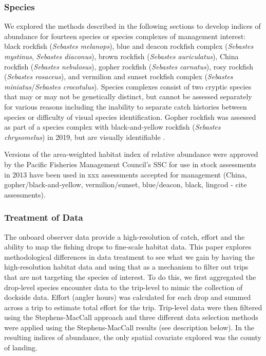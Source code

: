 \documentclass[preprint, 3p,
authoryear]{elsarticle} %
\begin{document}
\hypertarget{species}{%
\subsubsection{Species}\label{species}}

We explored the methods described in the following sections to develop
indices of abundance for fourteen species or species complexes of
management interest: black rockfish (\emph{Sebastes melanops}), blue and
deacon rockfish complex (\emph{Sebastes mystinus}, \emph{Sebastes
diaconus}), brown rockfish (\emph{Sebastes auriculatus}), China rockfish
(\emph{Sebastes nebulosus}), gopher rockfish (\emph{Sebastes carnatus}),
rosy rockfish (\emph{Sebastes rosaceus}), and vermilion and sunset
rockfish complex (\emph{Sebastes miniatus}/\emph{Sebastes crocotulus}).
Species complexes consist of two cryptic species that may or may not be
genetically distinct, but cannot be assessed separately for various
reasons including the inability to separate catch histories between
species or difficulty of visual species identification. Gopher rockfish
was assessed as part of a species complex with black-and-yellow rockfish
(\emph{Sebastes chrysomelus}) in 2019, but are visually identifiable
\citep{Monk2019}.

Versions of the area-weighted habitat index of relative abundance were
approved by the Pacific Fisheries Management Council's SSC for use in
stock assessments in 2013 have been used in xxx assessments accepted for
management (China, gopher/black-and-yellow, vermilion/sunset,
blue/deacon, black, lingcod - cite assessments).

\hypertarget{treatment-of-data}{%
\subsubsection{Treatment of Data}\label{treatment-of-data}}

The onboard observer data provide a high-resolution of catch, effort and
the ability to map the fishing drops to fine-scale habitat data. This
paper explores methodological differences in data treatment to see what
we gain by having the high-resolution habitat data and using that as a
mechanism to filter out trips that are not targeting the species of
interest. To do this, we first aggregated the drop-level species
encounter data to the trip-level to mimic the collection of dockside
data. Effort (angler hours) was calculated for each drop and summed
across a trip to estimate total effort for the trip. Trip-level data
were then filtered using the Stephens-MacCall approach and three
different data selection methods were applied using the Stephens-MacCall
results (see description below). In the resulting indices of abundance,
the only spatial covariate explored was the county of landing.
\end{document}
